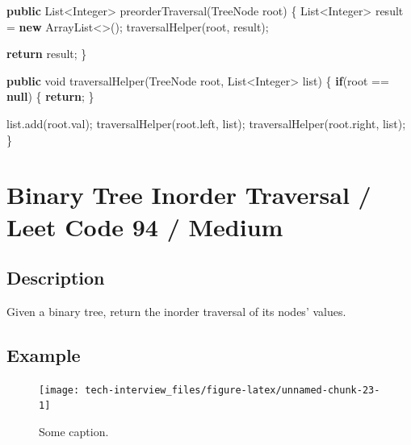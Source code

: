 \documentclass[]{book}
\newenvironment{Shaded}{\begin{snugshade}}{\end{snugshade}}
\newcommand{\BuiltInTok}[1]{#1}
\newcommand{\DataTypeTok}[1]{\textcolor[rgb]{0.13,0.29,0.53}{#1}}
\newcommand{\FunctionTok}[1]{\textcolor[rgb]{0.00,0.00,0.00}{#1}}
\newcommand{\KeywordTok}[1]{\textcolor[rgb]{0.13,0.29,0.53}{\textbf{#1}}}
\newcommand{\NormalTok}[1]{#1}
\begin{document}
\begin{Shaded}
\begin{Highlighting}[]
\KeywordTok{public} \BuiltInTok{List}\NormalTok{<}\BuiltInTok{Integer}\NormalTok{> }\FunctionTok{preorderTraversal}\NormalTok{(}\BuiltInTok{TreeNode}\NormalTok{ root) \{}
    \BuiltInTok{List}\NormalTok{<}\BuiltInTok{Integer}\NormalTok{> result = }\KeywordTok{new} \BuiltInTok{ArrayList}\NormalTok{<>();}
    \FunctionTok{traversalHelper}\NormalTok{(root, result);}

    \KeywordTok{return}\NormalTok{ result;}
\NormalTok{\}}

\KeywordTok{public} \DataTypeTok{void} \FunctionTok{traversalHelper}\NormalTok{(}\BuiltInTok{TreeNode}\NormalTok{ root, }\BuiltInTok{List}\NormalTok{<}\BuiltInTok{Integer}\NormalTok{> list) \{}
    \KeywordTok{if}\NormalTok{(root == }\KeywordTok{null}\NormalTok{) \{}
        \KeywordTok{return}\NormalTok{;}
\NormalTok{    \}}

\NormalTok{    list.}\FunctionTok{add}\NormalTok{(root.}\FunctionTok{val}\NormalTok{);}
    \FunctionTok{traversalHelper}\NormalTok{(root.}\FunctionTok{left}\NormalTok{, list);}
    \FunctionTok{traversalHelper}\NormalTok{(root.}\FunctionTok{right}\NormalTok{, list);}
\NormalTok{\}}
\end{Highlighting}
\end{Shaded}

\hypertarget{binary-tree-inorder-traversal-leet-code-94-medium}{%
\section{Binary Tree Inorder Traversal / Leet Code 94 / Medium}\label{binary-tree-inorder-traversal-leet-code-94-medium}}

\label{sec:depth_first_inorder}

\hypertarget{description-63}{%
\subsection{Description}\label{description-63}}

Given a binary tree, return the inorder traversal of its nodes' values.

\hypertarget{example-60}{%
\subsection{Example}\label{example-60}}

\begin{figure}
\texttt{[image: tech-interview\_files/figure-latex/unnamed-chunk-23-1]} \caption{Some caption.}\label{fig:unnamed-chunk-23}
\end{figure}
\end{document}
